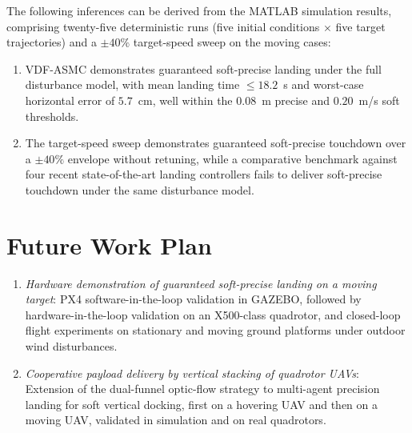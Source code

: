 \documentclass[conf]{new-aiaa}
\begin{document}
The following inferences can be derived from the MATLAB simulation results, comprising twenty-five deterministic runs (five initial conditions $\times$ five target trajectories) and a $\pm 40\%$ target-speed sweep on the moving cases:
\begin{enumerate}
    \item VDF-ASMC demonstrates guaranteed soft-precise landing under the full disturbance model, with mean landing time $\le 18.2$~s and worst-case horizontal error of $5.7$~cm, well within the $0.08$~m precise and $0.20$~m/s soft thresholds.
    \item The target-speed sweep demonstrates guaranteed soft-precise touchdown over a $\pm 40\%$ envelope without retuning, while a comparative benchmark against four recent state-of-the-art landing controllers \cite{lin2022, zhang2026, chen2025, cho2022} fails to deliver soft-precise touchdown under the same disturbance model.
\end{enumerate}

\section*{Future Work Plan}
\begin{enumerate}
    \item \textit{Hardware demonstration of guaranteed soft-precise landing on a moving target}: PX4 software-in-the-loop validation in GAZEBO, followed by hardware-in-the-loop validation on an X500-class quadrotor, and closed-loop flight experiments on stationary and moving ground platforms under outdoor wind disturbances.
    \item \textit{Cooperative payload delivery by vertical stacking of quadrotor UAVs}: Extension of the dual-funnel optic-flow strategy to multi-agent precision landing for soft vertical docking, first on a hovering UAV and then on a moving UAV, validated in simulation and on real quadrotors.
\end{enumerate}


\end{document}
